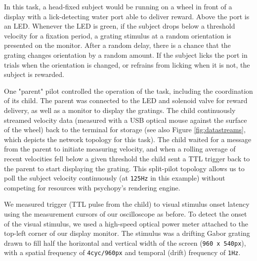 In this task, a head-fixed subject would be running on a wheel in front of a display with a lick-detecting water port able to deliver reward. Above the port is an LED. Whenever the LED is green, if the subject drops below a threshold velocity for a fixation period, a grating stimulus at a random orientation is presented on the monitor. After a random delay, there is a chance that the grating changes orientation by a random amount. If the subject licks the port in trials when the orientation is changed, or refrains from licking when it is not, the subject is rewarded. 

One "parent" pilot controlled the operation of the task, including the coordination of its child. The parent was connected to the LED and solenoid valve for reward delivery, as well as a monitor to display the gratings. The child continuously streamed velocity data (measured with a USB optical mouse against the surface of the wheel) back to the terminal for storage (see also Figure \ref{fig:datastreams}, which depicts the network topology for this task). The child waited for a message from the parent to initiate measuring velocity, and when a rolling average of recent velocities fell below a given threshold the child sent a TTL trigger back to the parent to start displaying the grating. This split-pilot topology allows us to poll the subject velocity continuously (at \texttt{125Hz} in this example) without competing for resources with psychopy's rendering engine.

We measured trigger (TTL pulse from the child) to visual stimulus onset latency using the measurement cursors of our oscilloscope as before. To detect the onset of the visual stimulus, we used a high-speed optical power meter attached to the top-left corner of our display monitor. The stimulus was a drifting Gabor grating drawn to fill half the horizontal and vertical width of the screen (\texttt{960 x 540px}), with a spatial frequency of \texttt{4cyc/960px} and temporal (drift) frequency of \texttt{1Hz}.

